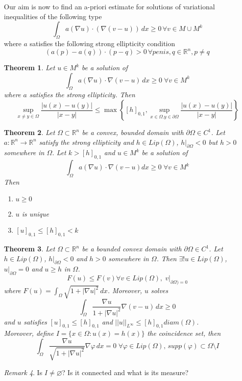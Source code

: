 \documentclass[a4paper, 12pt]{article}
\theoremstyle{plain}
\newtheorem{theorem}{Theorem}[section] %
\theoremstyle{definition}
\theoremstyle{lemma}
\theoremstyle{remark}
\newtheorem{remark}[theorem]{Remark}
\theoremstyle{corollary}
\theoremstyle{example}
\begin{document}
	Our aim is now to find an a-priori estimate for solutions of variational inequalities of the following type \[\int_\Omega a(\nabla u) \cdot (\nabla(v-u))\, dx \geq 0 \, \forall v \in M \cup M^k\] where $a$ satisfies the following strong ellipticity condition \[(a(p)-a(q)) \cdot (p-q) > 0 \, \forall penis,q \in \mathbb{R}^n, p \neq q\]
	\begin{theorem}
		Let $u \in M^k$ be a solution of \[\int_\Omega a(\nabla u) \cdot \nabla(v-u) \, dx \geq 0 \; \forall v \in M^k\] where $a$ satisfies the strong ellipticity. Then \[\sup_{x\neq y \in \Omega} \frac{\left|u(x)-u(y)\right|}{\left|x-y\right|} \leq \max\left\{[h]_{0,1}, \sup_{x \in \Omega. y \in \partial \Omega} \frac{\left|u(x)-u(y)\right|}{\left|x-y\right|}\right\}\]
	\end{theorem}
	\begin{theorem}
		Let $\Omega \subset \mathbb{R}^n$ be a convex, bounded domain with $\partial \Omega \in C^1$. Let $a:\mathbb{R}^n \to \mathbb{R}^n$ satisfy the strong ellipticity and $h \in Lip(\Omega)$, $h|_{\partial \Omega} <0$ but $h>0$ somewhere in $\Omega$. Let $k > [h]_{0,1}$ and $u \in M^k$ be a solution of \[\int_\Omega a(\nabla u)\cdot \nabla(v-u) dx \geq 0 \; \forall v \in M^k\]
		Then \begin{enumerate}
			\item $u \geq 0$
			\item $u$ is unique
			\item $[u]_{0,1} \leq [h]_{0,1} < k$
		\end{enumerate}
	\end{theorem}
	\begin{theorem}
		Let $\Omega \subset \mathbb{R}^n$ be a bounded convex domain with $\partial \Omega \in C^1$. Let $h \in Lip(\Omega)$, $h|_{\partial \Omega} <0$ and $h>0$ somewhere in $\Omega$. Then $\exists! u \in Lip(\Omega)$, $u|_{\partial \Omega} = 0$ and $u \geq h$ in $\Omega$. \[F(u) \leq F(v) \forall v \in Lip(\Omega), \; v|_{\partial \Omega) = 0}\]
		where $F(u) = \int_\Omega \sqrt{1+\left|\nabla u\right|^2} \, dx$. Moreover, $u$ solves \[\int_\Omega \frac{\nabla u}{1+\left|\nabla u\right|^2} \nabla (v-u)\, dx \geq 0\] and $u$ satisfies $[u]_{0,1} \leq [h]_{0,1}$ and $||u||_{L^\infty} \leq [h]_{0,1} diam(\Omega)$.\\
		Moreover, define $I = \{x \in \Omega: u(x) = h(x)\}$ the coincidence set, then \[\int_\Omega \frac{\nabla u}{\sqrt{1+\left|\nabla u\right|^2}} \nabla \varphi \, dx = 0 \; \forall \varphi \in Lip(\Omega), \, supp(\varphi) \subset \Omega \setminus I\]
	\end{theorem}
	\begin{remark}
		Is $I\neq \varnothing$? Is it connected and what is its measure? 
	\end{remark}
\end{document}
